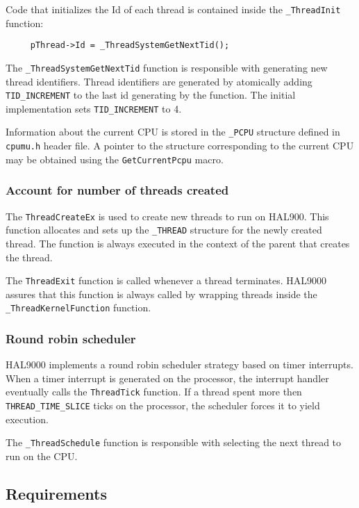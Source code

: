     Code that initializes the Id of each thread is contained inside the \lstinline|_ThreadInit| function:
    \begin{lstlisting}
     pThread->Id = _ThreadSystemGetNextTid();
    \end{lstlisting}
    
    The \lstinline|_ThreadSystemGetNextTid| function is responsible with generating new thread identifiers. Thread identifiers are generated by atomically adding \lstinline{TID_INCREMENT} to the last id generating by the function. The initial implementation sets \lstinline|TID_INCREMENT| to 4. 
    
    Information about the current CPU is stored in the \lstinline|_PCPU| structure defined in \lstinline|cpumu.h| header file. A pointer to the structure corresponding to the current CPU may be obtained using the \lstinline|GetCurrentPcpu| macro. 

\subsubsection{Account for number of threads created}
    The \lstinline|ThreadCreateEx| is used to create new threads to run on HAL900. This function allocates and sets up the \lstinline|_THREAD| structure for the newly created thread. The function is always executed in the context of the parent that creates the thread. 

    The \lstinline|ThreadExit| function is called whenever a thread terminates. HAL9000 assures that this function is always called by wrapping threads inside the \lstinline|_ThreadKernelFunction| function. 
    
\subsubsection{Round robin scheduler}
    HAL9000 implements a round robin scheduler strategy based on timer interrupts. When a timer interrupt is generated on the processor, the interrupt handler eventually calls the \lstinline|ThreadTick| function. If a thread spent more then \lstinline|THREAD_TIME_SLICE| ticks on the processor, the scheduler forces it to yield execution. 
    
    The \lstinline{_ThreadSchedule} function is responsible with selecting the next thread to run on the CPU. 



\subsection{Requirements}

